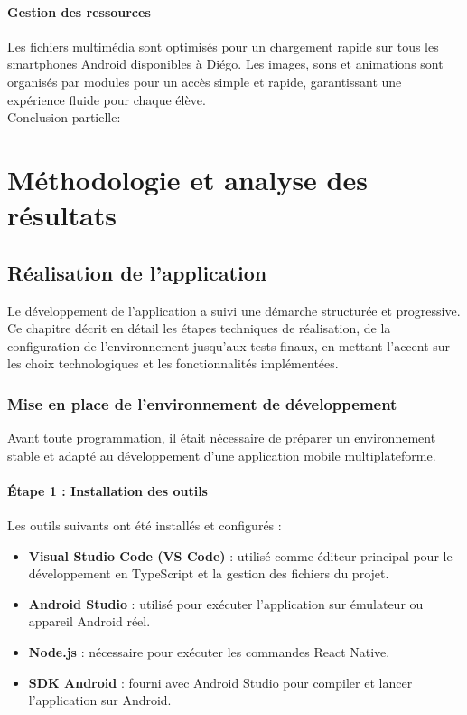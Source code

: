 \documentclass[a4paper,oneside,12pt]{book}
\begin{document}
\subsection{Gestion des ressources}
Les fichiers multimédia sont optimisés pour un chargement rapide sur tous les smartphones Android disponibles à Diégo. Les images, sons et animations sont organisés par modules pour un accès simple et rapide, garantissant une expérience fluide pour chaque élève.\\


Conclusion partielle:

\part{Méthodologie et analyse des résultats}\label{part2}

\chapter{Réalisation de l'application}\label{chap3}
Le développement de l’application a suivi une démarche structurée et progressive. Ce chapitre décrit en détail les étapes techniques de réalisation, de la configuration de l’environnement jusqu’aux tests finaux, en mettant l’accent sur les choix technologiques et les fonctionnalités implémentées.

\section{Mise en place de l'environnement de développement}

Avant toute programmation, il était nécessaire de préparer un environnement stable et adapté au développement d'une application mobile multiplateforme.

\subsection{Étape 1 : Installation des outils}

Les outils suivants ont été installés et configurés :

\begin{itemize}
	\item \textbf{Visual Studio Code (VS Code)} : utilisé comme éditeur principal pour le développement en TypeScript et la gestion des fichiers du projet.
	\item \textbf{Android Studio} : utilisé pour exécuter l'application sur émulateur ou appareil Android réel.
	\item \textbf{Node.js} : nécessaire pour exécuter les commandes React Native.
	\item \textbf{SDK Android} : fourni avec Android Studio pour compiler et lancer l'application sur Android.
\end{itemize}
\end{document}
